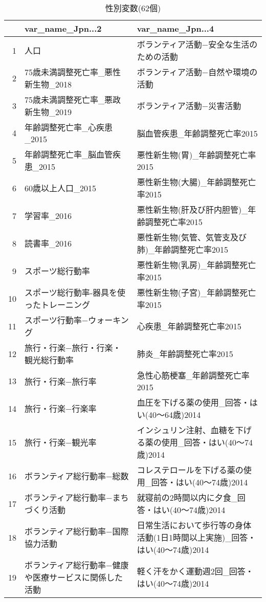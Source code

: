 \begin{table}[ht]
\centering
\caption{性別変数(62個)} 
\label{table_mf_d2.tex}
\begingroup\tiny
\begin{tabular}{rll}
  \hline
 & var\_name\_Jpn...2 & var\_name\_Jpn...4 \\ 
  \hline
1 & 人口 & ボランティア活動−安全な生活のための活動 \\ 
  2 & 75歳未満調整死亡率\_悪性新生物\_2018 & ボランティア活動−自然や環境の活動 \\ 
  3 & 75歳未満調整死亡率\_悪政新生物\_2019 & ボランティア活動−災害活動 \\ 
  4 & 年齢調整死亡率\_心疾患\_2015 & 脳血管疾患\_年齢調整死亡率2015 \\ 
  5 & 年齢調整死亡率\_脳血管疾患\_2015 & 悪性新生物(胃)\_年齢調整死亡率2015 \\ 
  6 & 60歳以上人口\_2015 & 悪性新生物(大腸)\_年齢調整死亡率2015 \\ 
  7 & 学習率\_2016 & 悪性新生物(肝及び肝内胆管)\_年齢調整死亡率2015 \\ 
  8 & 読書率\_2016 & 悪性新生物(気管、気管支及び肺)\_年齢調整死亡率2015 \\ 
  9 & スポーツ総行動率 & 悪性新生物(乳房)\_年齢調整死亡率2015 \\ 
  10 & スポーツ総行動率-器具を使ったトレーニング & 悪性新生物(子宮)\_年齢調整死亡率2015 \\ 
  11 & スポーツ行動率−ウォーキング & 心疾患\_年齢調整死亡率2015 \\ 
  12 & 旅行・行楽−旅行・行楽・観光総行動率 & 肺炎\_年齢調整死亡率2015 \\ 
  13 & 旅行・行楽−旅行率 & 急性心筋梗塞\_年齢調整死亡率2015 \\ 
  14 & 旅行・行楽−行楽率 & 血圧を下げる薬の使用\_回答・はい(40〜64歳)2014 \\ 
  15 & 旅行・行楽−観光率 & インシュリン注射、血糖を下げる薬の使用\_回答・はい(40〜74歳)2014 \\ 
  16 & ボランティア総行動率−総数 & コレステロールを下げる薬の使用\_回答・はい(40〜74歳)2014 \\ 
  17 & ボランティア総行動率−まちづくり活動 & 就寝前の2時間以内に夕食\_回答・はい(40〜74歳)2014 \\ 
  18 & ボランティア総行動率−国際協力活動 & 日常生活において歩行等の身体活動(1日1時間以上実施)\_回答・はい(40〜74歳)2014 \\ 
  19 & ボランティア総行動率−健康や医療サービスに関係した活動 & 軽く汗をかく運動週2回\_回答・はい(40〜74歳)2014 \\ 

\end{tabular}
\end{table}
